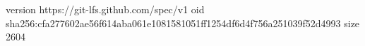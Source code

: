 version https://git-lfs.github.com/spec/v1
oid sha256:cfa277602ae56f614aba061e1081581051ff1254df6d4f756a251039f52d4993
size 2604
